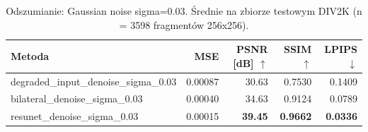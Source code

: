 \begin{table}[h]
\centering
\begin{tabular}{lrrrr}
\hline
Metoda & MSE & PSNR [dB] $\uparrow$ & SSIM $\uparrow$ & LPIPS $\downarrow$ \\
\hline
degraded\_input\_denoise\_sigma\_0.03 & 0.00087 & 30.63 & 0.7530 & 0.1409 \\
bilateral\_denoise\_sigma\_0.03 & 0.00040 & 34.63 & 0.9124 & 0.0789 \\
resunet\_denoise\_sigma\_0.03 & 0.00015 & \textbf{39.45} & \textbf{0.9662} & \textbf{0.0336} \\
\hline
\end{tabular}
\caption{Odszumianie: Gaussian noise sigma=0.03. Średnie na zbiorze testowym DIV2K (n = 3598 fragmentów 256x256).}
\end{table}
